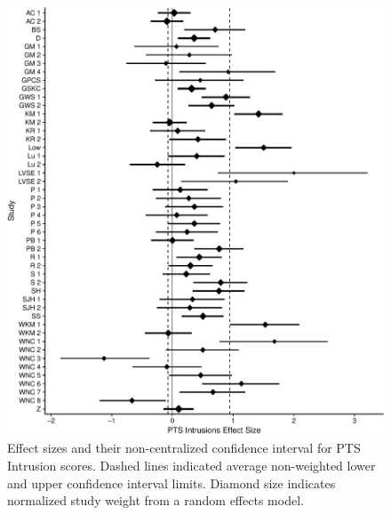\documentclass[english,man, mask]{apa6}
\theoremstyle{definition}
\theoremstyle{definition}
\theoremstyle{definition}
\theoremstyle{remark}
\begin{document}
\begin{figure}[htbp]
\centering
\includegraphics{meta_markdown_files/figure-latex/ptspicint-1.pdf}
\caption{\label{fig:ptspicint}Effect sizes and their non-centralized
confidence interval for PTS Intrusion scores. Dashed lines indicated
average non-weighted lower and upper confidence interval limits. Diamond
size indicates normalized study weight from a random effects model.}
\end{figure}
\end{document}
